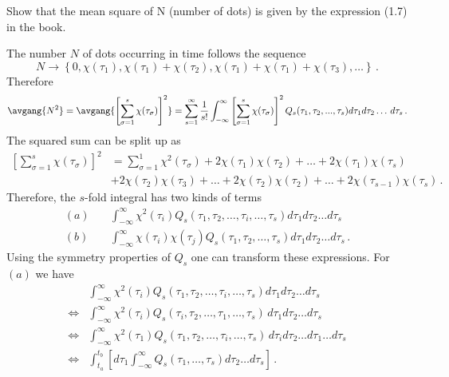 

Show that the mean square of N (number of dots) is given by the expression (1.7) in the book.


The number $N$ of dots occurring in time follows the sequence
\begin{equation}
  N \rightarrow \left\{ 0, \chi(\tau_1), \chi(\tau_1) + \chi(\tau_2), \chi(\tau_1) + \chi(\tau_1) + \chi(\tau_3),\dots \right\}
  \, .
\end{equation}
Therefore
\begin{equation}
  \avgang{N^2}
  = \avgang{\left[ \sum_{\sigma=1}^s \chi(\tau_{\sigma})\right]^2}
  = \sum_{s=1}^{\infty} \frac{1}{s!} \int_{-\infty}^{\infty} \left[\sum_{\sigma=1}^s \chi(\tau_{\sigma})\right]^2Q_s(\tau_1,\tau_2,...,\tau_s)d\tau_1d\tau_2 \ldots \, d\tau_s
  \, .
\end{equation}
The squared sum can be split up as
\begin{align*}
  \left[ \sum_{\sigma=1}^s \chi(\tau_{\sigma}) \right]^2
  &=\sum_{\sigma=1}^1 \chi^2(\tau_{\sigma})+2\chi(\tau_1)\chi(\tau_2) + \ldots + 2 \chi(\tau_1) \chi(\tau_s)\\
  & +2 \chi(\tau_2) \chi(\tau_3) + \ldots + 2 \chi(\tau_2) \chi(\tau_2) + \ldots + 2 \chi(\tau_{s-1}) \chi(\tau_s)
  \, .
\end{align*}
Therefore, the $s$-fold integral has two kinds of terms
\begin{align*}
  (a) &\quad \int_{-\infty}^{\infty} \chi^2(\tau_i) Q_s(\tau_1, \tau_2, \ldots, \tau_i, \ldots, \tau_s) d\tau_1 d\tau_2 \ldots d \tau_s\\
  (b) &\quad \int_{-\infty}^{\infty} \chi(\tau_i) \chi(\tau_j) Q_s(\tau_1,\tau_2, \ldots, \tau_s) d\tau_1 d\tau_2 \ldots d\tau_s
  \, .
\end{align*}
Using the symmetry properties of $Q_s$ one can transform these expressions. For $(a)$ we have
\begin{align*}
  & \int_{-\infty}^{\infty}\chi^2(\tau_i)Q_s(\tau_1,\tau_2, \ldots,\tau_i, \ldots, \tau_s)d\tau_1d\tau_2 \ldots d\tau_s \\
  \Leftrightarrow &\int_{-\infty}^{\infty} \chi^2(\tau_i) Q_s(\tau_i,\tau_2, \ldots, \tau_1, \ldots, \tau_s) \, d\tau_1 d\tau_2 \ldots d\tau_s \\
  \Leftrightarrow &\int_{-\infty}^{\infty} \chi^2(\tau_1) Q_s(\tau_1,\tau_2, \ldots, \tau_i, \ldots, \tau_s) \, d\tau_i d\tau_2 \ldots d\tau_1 \ldots d\tau_s \\
  \Leftrightarrow &\int_{t_a}^{t_b}\left[d\tau_1 \int_{-\infty}^{\infty}Q_s(\tau_1, \ldots, \tau_s) d\tau_2 \ldots d\tau_s \right]
  \, .
\end{align*}
